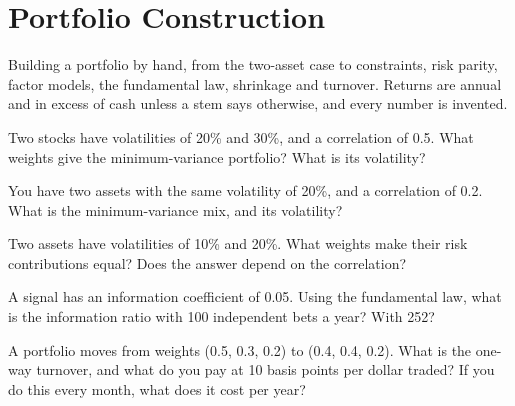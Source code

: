 \chapter{Portfolio Construction}\label{ch:iv2:portfolio-construction}

\begin{ivtrains}
Building a portfolio by hand, from the two-asset case to constraints, risk parity, factor models, the fundamental law, shrinkage and turnover. Returns are annual and in excess of cash unless a stem says otherwise, and every number is invented.
\end{ivtrains}

\begin{question}\label{iq:iv2:portfolio-construction:1}
Two stocks have volatilities of 20\% and 30\%, and a correlation of 0.5. What weights give the minimum-variance portfolio? What is its volatility?
\end{question}

\begin{question}\label{iq:iv2:portfolio-construction:2}
You have two assets with the same volatility of 20\%, and a correlation of 0.2. What is the minimum-variance mix, and its volatility?
\end{question}

\begin{question}\label{iq:iv2:portfolio-construction:3}
Two assets have volatilities of 10\% and 20\%. What weights make their risk contributions equal? Does the answer depend on the correlation?
\end{question}

\begin{question}\label{iq:iv2:portfolio-construction:4}
A signal has an information coefficient of 0.05. Using the fundamental law, what is the information ratio with 100 independent bets a year? With 252?
\end{question}

\begin{question}\label{iq:iv2:portfolio-construction:5}
A portfolio moves from weights (0.5, 0.3, 0.2) to (0.4, 0.4, 0.2). What is the one-way turnover, and what do you pay at 10 basis points per dollar traded? If you do this every month, what does it cost per year?
\end{question}

